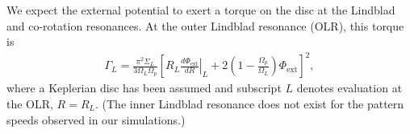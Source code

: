 
We expect the external potential to exert a torque on the disc at the
Lindblad and co-rotation resonances. At the outer Lindblad resonance
(OLR), this torque is 
\begin{align}
  \Gamma_L =
  \frac{\pi^2\Sigma_L}{3\Omega_L\Omega_p}
  \left[\left.R_L\frac{d\Phi_\mathrm{ext}}{dR}\right|_L + 2\left(1 -
      \frac{\Omega_p}{\Omega_L}\right)\Phi_\mathrm{ext}\right]^2, 
\end{align}   
where a Keplerian disc has been assumed and subscript $L$ denotes
evaluation at the OLR, $R=R_L$. (The inner Lindblad resonance does not
exist for the pattern speeds observed in our simulations.) 

